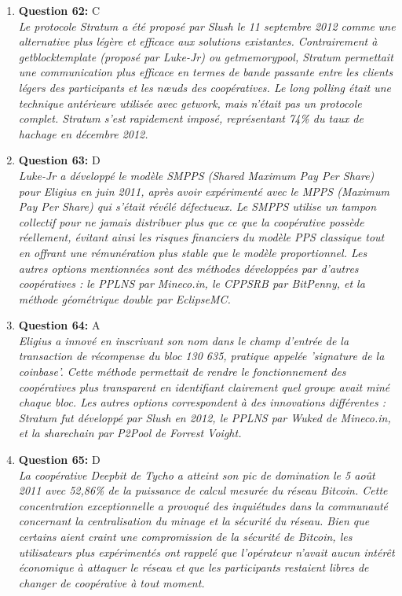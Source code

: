 \documentclass[12pt,a4paper]{article}
\begin{document}
\begin{enumerate}
\item \textbf{Question 62:} C
\\ \textit{Le protocole Stratum a été proposé par Slush le 11 septembre 2012 comme une alternative plus légère et efficace aux solutions existantes. Contrairement à getblocktemplate (proposé par Luke-Jr) ou getmemorypool, Stratum permettait une communication plus efficace en termes de bande passante entre les clients légers des participants et les nœuds des coopératives. Le long polling était une technique antérieure utilisée avec getwork, mais n'était pas un protocole complet. Stratum s'est rapidement imposé, représentant 74\% du taux de hachage en décembre 2012.}

\item \textbf{Question 63:} D
\\ \textit{Luke-Jr a développé le modèle SMPPS (Shared Maximum Pay Per Share) pour Eligius en juin 2011, après avoir expérimenté avec le MPPS (Maximum Pay Per Share) qui s'était révélé défectueux. Le SMPPS utilise un tampon collectif pour ne jamais distribuer plus que ce que la coopérative possède réellement, évitant ainsi les risques financiers du modèle PPS classique tout en offrant une rémunération plus stable que le modèle proportionnel. Les autres options mentionnées sont des méthodes développées par d'autres coopératives : le PPLNS par Mineco.in, le CPPSRB par BitPenny, et la méthode géométrique double par EclipseMC.}

\item \textbf{Question 64:} A
\\ \textit{Eligius a innové en inscrivant son nom dans le champ d'entrée de la transaction de récompense du bloc 130 635, pratique appelée 'signature de la coinbase'. Cette méthode permettait de rendre le fonctionnement des coopératives plus transparent en identifiant clairement quel groupe avait miné chaque bloc. Les autres options correspondent à des innovations différentes : Stratum fut développé par Slush en 2012, le PPLNS par Wuked de Mineco.in, et la sharechain par P2Pool de Forrest Voight.}

\item \textbf{Question 65:} D
\\ \textit{La coopérative Deepbit de Tycho a atteint son pic de domination le 5 août 2011 avec 52,86\% de la puissance de calcul mesurée du réseau Bitcoin. Cette concentration exceptionnelle a provoqué des inquiétudes dans la communauté concernant la centralisation du minage et la sécurité du réseau. Bien que certains aient craint une compromission de la sécurité de Bitcoin, les utilisateurs plus expérimentés ont rappelé que l'opérateur n'avait aucun intérêt économique à attaquer le réseau et que les participants restaient libres de changer de coopérative à tout moment.}


\end{enumerate}
\end{document}

